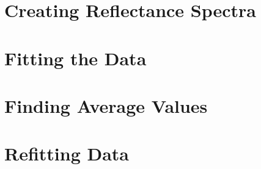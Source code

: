 \documentclass[english]{scrartcl}
\begin{document}
\section{Creating Reflectance Spectra}

\section{Fitting the Data}

\section{Finding Average Values}

\section{Refitting Data}
\end{document}
